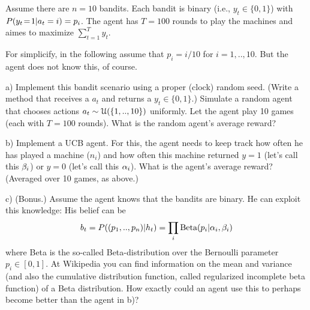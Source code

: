 

\renewcommand{\course}{Optimization}
\renewcommand{\coursepicture}{optim}
\renewcommand{\coursedate}{Summer 2015}
\renewcommand{\exnum}{1}

\exercises



Assume there are $n=10$ bandits. Each bandit is binary (i.e.,
$y_t\in\{0,1\}$) with $P(y_t\=1 | a_t=i) = p_i$. The agent has $T=100$
rounds to play the machines and aimes to maximize $\sum_{t=1}^T y_t$.

For simplicify, in the following assume that $p_i = i/10$ for
$i=1,..,10$. But the agent does not know this, of course.

a) Implement this bandit scenario using a proper (clock) random
seed. (Write a method that receives a $a_t$ and returns a
$y_t\in\{0,1\}$.) Simulate a random agent that chooses actions
$a_t \sim\UU(\{1,..,10\})$ uniformly. Let the agent play 10 games
(each with $T=100$ rounds). What is the random agent's average reward?

b) Implement a UCB agent. For this, the agent needs to keep track how
often he has played a machine ($n_i$) and how often this machine
returned $y=1$ (let's call this $\b_i$) or $y=0$ (let's call this
$\a_i$). What is the agent's average reward?  (Averaged over 10 games, as
above.)

c) (Bonus.) Assume the agent knows that the bandits are binary. He can
exploit this knowledge: His belief can be
$$b_t = P((p_1,..,p_n)|h_t) = \prod_i \text{Beta}(p_i|\a_i,\b_i)$$
where Beta is the so-called Beta-distribution over the Bernoulli
parameter $p_i\in[0,1]$. At Wikipedia you can find information on the
mean and variance (and also the cumulative distribution function, called
regularized incomplete beta function) of a Beta distribution. How
exactly could an agent use this to perhaps become better than the
agent in b)?

\exerfoot
